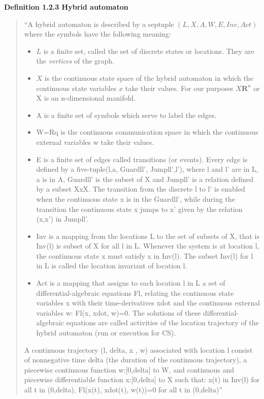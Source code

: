 \documentclass[12pt]{article}
\begin{document}
\textbf{Definition 1.2.3 Hybrid automaton}
\begin{quote}
	``A hybrid automaton is described by a septuple $(L,X,A,W,E,Inv, Act)$ where the symbols have the following meaning:
	
\begin{itemize}
	\item $L$ is a finite set, called the set of discrete states or locations. They are the \emph{vertices} of the graph.
	\item $X$ is the continuous state space of the hybrid automaton in which the continuous state variables $x$ take their values. For our purposes $X  \mathbf{R}^n$ or X is an n-dimensional manifold.
	\item A is a finite set of symbols which serve to label the edges.
	\item W=Rq is the continuous communication space in which the continuous external variables w take their values.
	\item E is a finite set of edges called transitions (or events). Every edge is defined by a five-tuple(l,a, Guardll', Jumpll',l'), where l and l' are in L, a is in A, Guardll' is the subset of X and Jumpll' is a relation defined by a subset XxX. The transition from the discrete l to l' is enabled when the continuous state x is in the Guardll', while during the transition the continuous state x jumps to x' given by the relation (x,x') in Jumpll'.
	\item Inv is a mapping from the locations L to the set of subsets of X, that is Inv(l) is subset of X for all l in L. Whenever the system is at location l, the continuous state x must satisfy x in Inv(l). The subset Inv(l) for l in L is called the location invariant of location l.
	\item Act is a mapping that assigns to each location l in L a set of differential-algebraic equations Fl, relating the continuous state variables x with their time-derivatives xdot and the continuous external variables w: Fl(x, xdot, w)=0. The solutions of these differential-algebraic equations are called activities of the location trajectory of the hybrid automaton (run or execution for CS).
\end{itemize}
	
	A continuous trajectory (l, delta, x , w) associated with location l consist of nonnegative time delta (the duration of the continuous trajectory), a piecewise continuous function w:[0,delta] to W, and continuous and piecewise differentiable function x:[0,delta] to X such that: x(t) in Inv(l) for all t in (0,delta), Fl(x(t), xdot(t), w(t))=0 for all t in (0,delta)''
\end{quote}
\end{document}
